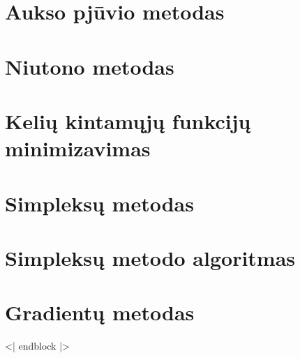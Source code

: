 \cite[211-213]{textbook}
\section{Aukso pjūvio metodas}
\cite[213-215]{textbook}
\section{Niutono metodas}
\cite[217]{textbook}
\section{Kelių kintamųjų funkcijų minimizavimas}
\cite[220-221]{textbook}
\section{Simpleksų metodas}
\cite[222-224]{textbook}
\section{Simpleksų metodo algoritmas}
\cite[225]{textbook}
\section{Gradientų metodas}

<| endblock |>
